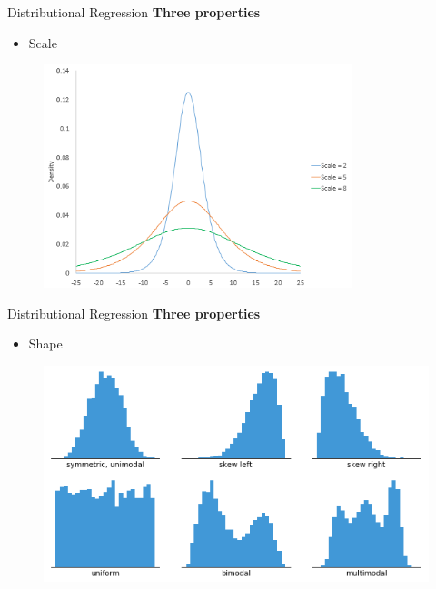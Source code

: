 \documentclass[t]{beamer} 	%
\begin{document}
\begin{frame}{Distributional Regression}
	\textbf{Three properties} \\
	\begin{itemize}
		\item Scale
	\end{itemize}
	\begin{figure}
		\includegraphics[width=0.8\textwidth]{images/scale.png}
	\end{figure}
\end{frame}

\begin{frame}{Distributional Regression}
	\textbf{Three properties} \\
	\citet{chartio_histogram}
	\begin{itemize}
		\item Shape
	\end{itemize}
	\begin{figure}
		\includegraphics[width=\textwidth]{images/histogram-example-2}
	\end{figure}
\end{frame}
\end{document}
